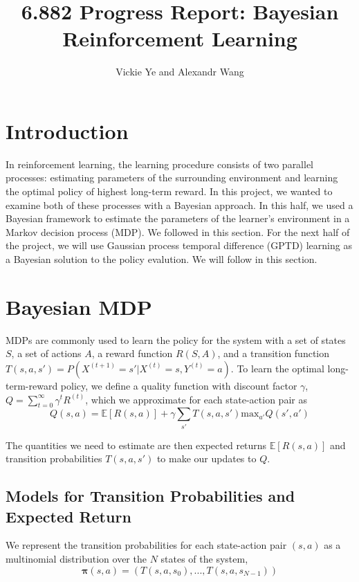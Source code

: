 \documentclass[10pt, twocolumn, twoside]{article}
\title{6.882 Progress Report: Bayesian Reinforcement Learning}
\date{}
\author {Vickie Ye and Alexandr Wang}
\begin{document}
\maketitle

\section{Introduction}
In reinforcement learning, the learning procedure consists of two parallel processes:
estimating parameters of the surrounding environment and learning the optimal policy
of highest long-term reward. In this project, we wanted to examine both of these
processes with a Bayesian approach. In this half, we used a Bayesian framework to
estimate the parameters of the learner's environment in a Markov decision process
(MDP). We followed \cite{strens} in this section. For the next half of
the project, we will use Gaussian process temporal difference (GPTD) learning as a
Bayesian solution to the policy evalution. We will follow \cite{engel} in this
section.

\section{Bayesian MDP}
MDPs are commonly used to learn the policy for the system with a set of states $S$,
a set of actions $A$, a reward function $R(S, A)$, and a transition function
$T(s, a, s') = P(X^{(t+1)} = s' | X^{(t)} = s, Y^{(t)} = a)$. To learn the optimal
long-term-reward policy, we define a quality function with discount factor
$\gamma$, $Q = \sum_{t=0}^\infty \gamma^t R^{(t)}$, which we approximate for each
state-action pair as
\begin{equation*}
Q(s, a) = \mathbb{E}[R(s,a)]+\gamma\sum_{s'}T(s, a, s')\textrm{max}_{a'} Q(s',a')
\end{equation*}

The quantities we need to estimate are then expected returns $\mathbb{E}[R(s, a)]$
and transition probabilities $T(s, a, s')$ to make our updates to $Q$.

\subsection{Models for Transition Probabilities and Expected Return}
We represent the transition probabilities for each state-action pair $(s, a)$ as
a multinomial distribution over the $N$ states of the system,
\begin{equation*}
\mathbf{\pi}(s, a) = (T(s, a, s_0), ..., T(s, a, s_{N-1}))
\end{equation*}
\end{document}
